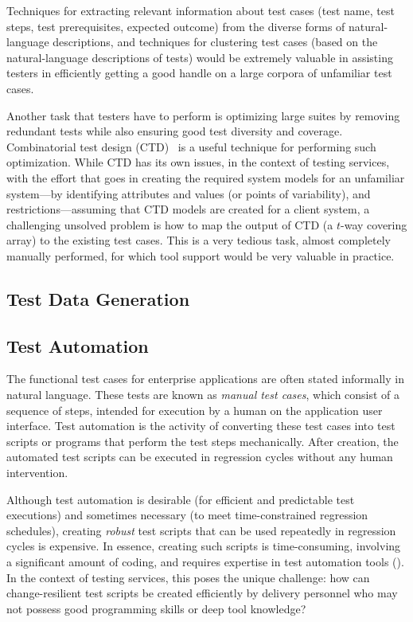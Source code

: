 Techniques for extracting relevant information about test cases (\eg test name,
test steps, test prerequisites, expected outcome) from the diverse forms of
natural-language descriptions, and techniques for clustering test cases (based
on the natural-language descriptions of tests) would be extremely valuable in
assisting testers in efficiently getting a good handle on a large corpora of
unfamiliar test cases.

Another task that testers have to perform is optimizing large suites by removing
redundant tests while also ensuring good test diversity and
coverage. Combinatorial test design (CTD)~\cite{Cohen:1996, Cohen:1997,
  Cohen:2003} is a useful technique for performing such optimization. While CTD
has its own issues, in the context of testing services, with the effort that
goes in creating the required system models for an unfamiliar system---by
identifying attributes and values (or points of variability), and
restrictions---assuming that CTD models are created for a client system, a
challenging unsolved problem is how to map the output of CTD (\ie a $t$-way
covering array) to the existing test cases. This is a very tedious task, almost
completely manually performed, for which tool support would be very valuable in
practice.

\subsection{Test Data Generation}
\label{sec:test-data}



\subsection{Test Automation}
\label{sec:test-automation}

The functional test cases for enterprise applications are often stated
informally in natural language. These tests are known as \textit{manual test
  cases}, which consist of a sequence of steps, intended for execution by a
human on the application user interface.  Test automation is the activity of
converting these test cases into test scripts or programs that perform the test
steps mechanically. After creation, the automated test scripts can be executed
in regression cycles without any human intervention.

Although test automation is desirable (\eg for efficient and predictable test
executions) and sometimes necessary (\eg to meet time-constrained regression
schedules), creating \textit{robust} test scripts that can be used repeatedly in
regression cycles is expensive. In essence, creating such scripts is
time-consuming, involving a significant amount of coding, and requires expertise
in test automation tools (\eg \cite{hpqtp,ibmrft,selenium}). In the context of
testing services, this poses the unique challenge: how can change-resilient test
scripts be created efficiently by delivery personnel who may not possess good
programming skills or deep tool knowledge?

